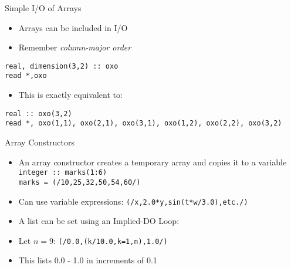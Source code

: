 \documentclass{beamer}
\begin{document}
\begin{frame}{Simple I/O of Arrays}

  \begin{itemize}
    \item Arrays can be included in I/O
    \vfill\item Remember \emph{column-major order}
  \end{itemize}
  \vfill
  \texttt{real, dimension(3,2) :: oxo} \\
  \texttt{read *,oxo} \\
  \begin{itemize}
    \vfill\item This is exactly equivalent to: 
  \end{itemize}
  \vfill
  \texttt{real :: oxo(3,2)} \\
  \texttt{read *, oxo(1,1), oxo(2,1), oxo(3,1), oxo(1,2), oxo(2,2), oxo(3,2)}

\end{frame}
\begin{frame}{Array Constructors}

  \begin{itemize}
    \item An array constructor creates a temporary array and copies it to a variable \\
    \hspace{1cm} \texttt{integer :: marks(1:6)} \\
    \hspace{1cm} \texttt{marks = (/10,25,32,50,54,60/)}

    \vfill\item Can use variable expressions:
    \hspace{1cm} \texttt{(/x,2.0*y,sin(t*w/3.0),etc./)}

    \vfill\item A list can be set using an \alert{Implied-DO Loop}:
    \item Let $n=9$:
    \hspace{1cm} \texttt{(/0.0,(k/10.0,k=1,n),1.0/)}
    \item This lists 0.0 - 1.0 in increments of 0.1
  \end{itemize}

\end{frame}
\end{document}
